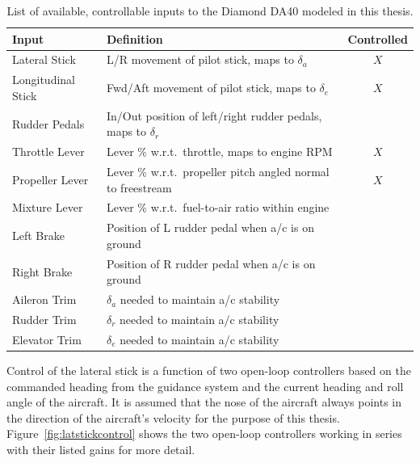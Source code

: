 \begin{table}[!ht]
    \caption{List of available, controllable inputs to the Diamond DA40 modeled in this thesis.}\label{tbl:controls}
    \centering
    \begin{tabular}{llc}
        \toprule
        \textbf{Input}     & \textbf{Definition}                                               & \textbf{Controlled} \\
        \midrule
        Lateral Stick      & L/R movement of pilot stick, maps to \(\delta_a\)                 & \(X\)               \\
        Longitudinal Stick & Fwd/Aft movement of pilot stick, maps to \(\delta_e\)             & \(X\)               \\
        Rudder Pedals      & In/Out position of left/right rudder pedals, maps to \(\delta_r\) &                     \\
        Throttle Lever     & Lever \% w.r.t.\ throttle, maps to engine RPM          & \(X\)               \\
        Propeller Lever    & Lever \% w.r.t.\ propeller pitch angled normal to freestream      & \(X\)               \\
        Mixture Lever      & Lever \% w.r.t.\ fuel-to-air ratio within engine                  &                     \\
        Left Brake         & Position of L rudder pedal when a/c is on ground                  &                     \\
        Right Brake        & Position of R rudder pedal when a/c is on ground                  &                     \\
        Aileron Trim       & \(\delta_a\) needed to maintain a/c stability                     &                     \\
        Rudder Trim        & \(\delta_r\) needed to maintain a/c stability                     &                     \\
        Elevator Trim      & \(\delta_e\) needed to maintain a/c stability                     &                     \\
        \bottomrule
    \end{tabular}
\end{table}

Control of the lateral stick is a function of two open-loop controllers based on the commanded heading from the guidance system and the current heading and roll angle of the aircraft. It is assumed that the nose of the aircraft always points in the direction of the aircraft's velocity for the purpose of this thesis. Figure~\ref{fig:latstickcontrol} shows the two open-loop controllers working in series with their listed gains for more detail.


